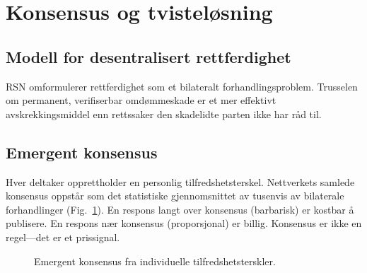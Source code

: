 \documentclass[11pt,a4paper,twocolumn]{article}
\begin{document}
\section{Konsensus og tvisteløsning}

\subsection{Modell for desentralisert rettferdighet}

RSN omformulerer rettferdighet som et bilateralt forhandlingsproblem. Trusselen om permanent, verifiserbar omdømmeskade er et mer effektivt avskrekkingsmiddel enn rettssaker den skadelidte parten ikke har råd til.

\subsection{Emergent konsensus}

Hver deltaker opprettholder en personlig tilfredshetsterskel. Nettverkets samlede konsensus oppstår som det statistiske gjennomsnittet av tusenvis av bilaterale forhandlinger (Fig.~\ref{fig:consensus}). En respons langt over konsensus (barbarisk) er kostbar å publisere. En respons nær konsensus (proporsjonal) er billig. Konsensus er ikke en regel---det er et prissignal.

\begin{figure}[ht]
\centering
{}
\caption{Emergent konsensus fra individuelle tilfredshetsterskler.}
\label{fig:consensus}
\end{figure}
\end{document}

